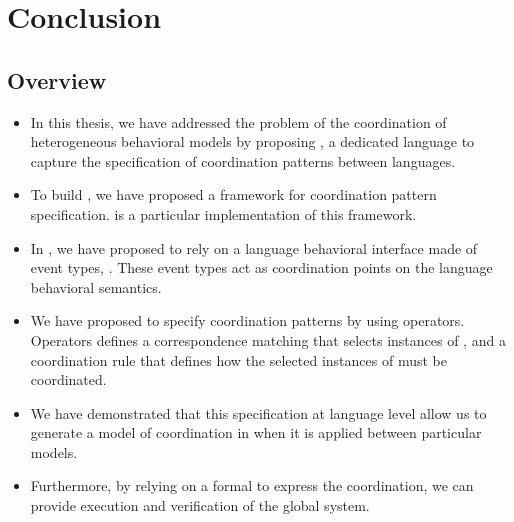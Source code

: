 \chapter{Conclusion}
\label{ch:conclusions}

\section{Overview}

\begin{itemize}
	
	
	\item In this thesis, we have addressed the problem of the coordination of heterogeneous behavioral models by proposing \bcool, a dedicated language to capture the specification of coordination patterns between languages. 
	
	\item To build \bcool, we have proposed a framework for coordination pattern specification. \bcool is a particular implementation of this framework.
	\item In \bcool, we have proposed to rely on a language behavioral interface made of event types, \ie \dse. These event types act as coordination points on the language behavioral semantics. 
	
	\item We have proposed to specify coordination patterns by using operators. Operators defines a correspondence matching that selects instances of \dse, and a coordination rule that defines how the selected instances of \dse must be coordinated.  

	\item We have demonstrated that this specification at language level allow us to generate a model of coordination in \ccsl when it is applied between particular models. 
	\item Furthermore, by relying on a formal to express the coordination, we can provide execution and verification of the global system.   
	

\end{itemize}
